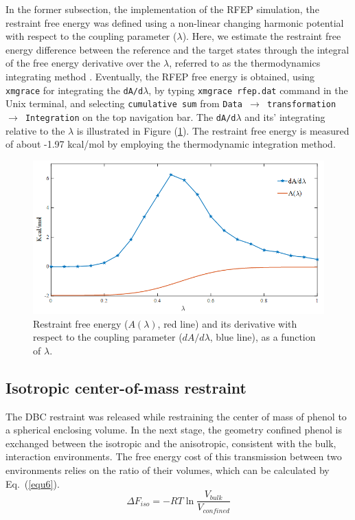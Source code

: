 \documentclass[9pt,tutorial]{livecoms}
\begin{document}
In the former subsection, the implementation of the RFEP simulation, the restraint free energy was defined using a non-linear changing harmonic potential with respect to the coupling parameter ({$\lambda$}). Here, we estimate the restraint free energy difference between the reference and the target states through the integral of the free energy derivative over the {$\lambda$}, referred to as the thermodynamics integrating method \cite{Kirkwood1935,frenkel2001understanding}. Eventually, the RFEP free energy is obtained, using \texttt{xmgrace} for integrating the \texttt{dA/d$\lambda$}, by typing \texttt{xmgrace rfep.dat} command in the Unix terminal, and selecting \texttt{cumulative sum} from \texttt{Data  {$\rightarrow$} transformation {$\rightarrow$} Integration} on the top navigation bar. The \texttt{dA/d{$\lambda$}} and its’ integrating relative to the {$\lambda$} is illustrated in Figure (\ref{fig:RFEP2}). The restraint free energy is measured of about -1.97 kcal/mol by employing the thermodynamic integration method. 
\begin{figure}[h!t]
\centering
\includegraphics[width=\linewidth]{RFEP}
\caption{Restraint free energy ($A(\lambda)$, red line) and its derivative with respect to the coupling parameter ($dA/d\lambda$, blue line), as a function of {$\lambda$}.}
\label{fig:RFEP2}
\end{figure}

\subsection{Isotropic center-of-mass restraint}
The DBC restraint was released while restraining the center of mass of phenol to a spherical enclosing volume. In the next stage, the geometry confined phenol is exchanged between the isotropic and the anisotropic, consistent with the bulk, interaction environments. The free energy cost of this transmission between two environments relies on the ratio of their volumes, which can be calculated by Eq.~(\ref{equ6}).
\begin{equation}\label{equ6}
\Delta F_{iso}=-RT\ln{\frac{V_{bulk}}{V_{confined}}}
\end{equation}
\end{document}
